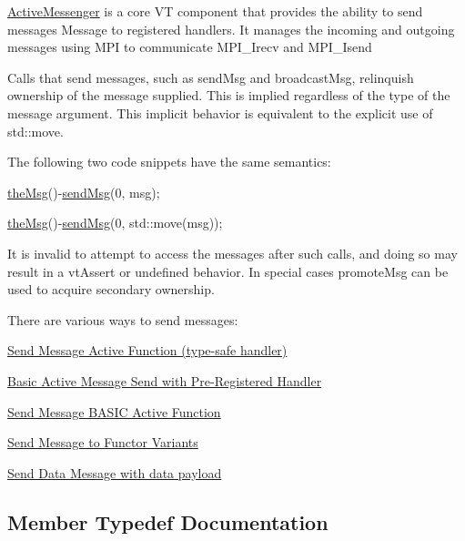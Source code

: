 \hyperlink{structvt_1_1messaging_1_1_active_messenger}{Active\+Messenger} is a core VT component that provides the ability to send messages {\ttfamily Message} to registered handlers. It manages the incoming and outgoing messages using M\+PI to communicate {\ttfamily M\+P\+I\+\_\+\+Irecv} and {\ttfamily M\+P\+I\+\_\+\+Isend} 

Calls that send messages, such as {\ttfamily send\+Msg} and {\ttfamily broadcast\+Msg}, relinquish ownership of the message supplied. This is implied regardless of the type of the message argument. This implicit behavior is equivalent to the explicit use of {\ttfamily std\+::move}.

The following two code snippets have the same semantics\+:


\begin{DoxyCode}
\hyperlink{namespacevt_aeafd31f866aeb4dc6fc2f6ee97136350}{theMsg}()-\hyperlink{group__preregister_ga0162a39473e7f9b490a79a7983d949ac}{sendMsg}(0, msg);
\end{DoxyCode}



\begin{DoxyCode}
\hyperlink{namespacevt_aeafd31f866aeb4dc6fc2f6ee97136350}{theMsg}()-\hyperlink{group__preregister_ga0162a39473e7f9b490a79a7983d949ac}{sendMsg}(0, std::move(msg));
\end{DoxyCode}


It is invalid to attempt to access the messages after such calls, and doing so may result in a vt\+Assert or undefined behavior. In special cases {\ttfamily promote\+Msg} can be used to acquire secondary ownership.

There are various ways to send messages\+:
\begin{DoxyItemize}
\item \hyperlink{group__typesafehan}{Send Message Active Function (type-\/safe handler)}
\item \hyperlink{group__preregister}{Basic Active Message Send with Pre-\/\+Registered Handler}
\item \hyperlink{group__basicsend}{Send Message B\+A\+S\+IC Active Function}
\item \hyperlink{group__functorsend}{Send Message to Functor Variants}
\item \hyperlink{group__sendpayload}{Send Data Message with data payload} 
\end{DoxyItemize}

\subsection{Member Typedef Documentation}
\mbox{\label{structvt_1_1messaging_1_1_active_messenger_a80a9cbda399d7bf035bfcecc761f4b02}} 
